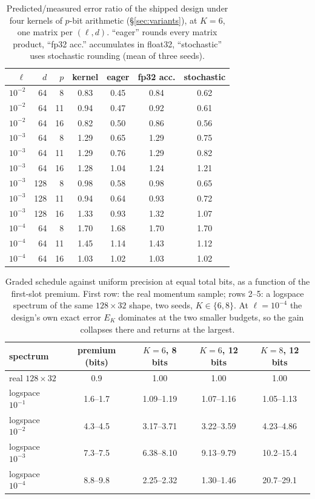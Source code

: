 \begin{table}[h]
\centering
\caption{Predicted/measured error ratio of the shipped design under four kernels of
$p$-bit arithmetic (\S\ref{sec:variants}), at $K=6$, one matrix per
$(\ell,d)$.  ``eager'' rounds every matrix product, ``fp32 acc.'' accumulates in
float32, ``stochastic'' uses stochastic rounding (mean of three seeds).}
\label{tab:variants}
\begin{tabular}{rrrcccc}
\toprule
$\ell$ & $d$ & $p$ & kernel & eager & fp32 acc. & stochastic \\
\midrule
$10^{-2}$ & 64 & 8 & 0.83 & 0.45 & 0.84 & 0.62 \\
$10^{-2}$ & 64 & 11 & 0.94 & 0.47 & 0.92 & 0.61 \\
$10^{-2}$ & 64 & 16 & 0.82 & 0.50 & 0.86 & 0.56 \\
$10^{-3}$ & 64 & 8 & 1.29 & 0.65 & 1.29 & 0.75 \\
$10^{-3}$ & 64 & 11 & 1.29 & 0.76 & 1.29 & 0.82 \\
$10^{-3}$ & 64 & 16 & 1.28 & 1.04 & 1.24 & 1.21 \\
$10^{-3}$ & 128 & 8 & 0.98 & 0.58 & 0.98 & 0.65 \\
$10^{-3}$ & 128 & 11 & 0.94 & 0.64 & 0.93 & 0.72 \\
$10^{-3}$ & 128 & 16 & 1.33 & 0.93 & 1.32 & 1.07 \\
$10^{-4}$ & 64 & 8 & 1.70 & 1.68 & 1.70 & 1.70 \\
$10^{-4}$ & 64 & 11 & 1.45 & 1.14 & 1.43 & 1.12 \\
$10^{-4}$ & 64 & 16 & 1.03 & 1.02 & 1.03 & 1.02 \\
\bottomrule
\end{tabular}
\end{table}

\begin{table}[h]
\centering
\caption{Graded schedule against uniform precision at equal total bits, as a function
of the first-slot premium.  First row: the real momentum sample; rows 2--5: a
logspace spectrum of the same $128\times32$ shape, two seeds, $K\in\{6,8\}$.  At
$\ell=10^{-4}$ the design's own exact error $E_K$ dominates at the two smaller budgets,
so the gain collapses there and returns at the largest.}
\label{tab:premium}
\begin{tabular}{lcccc}
\toprule
spectrum & premium (bits) & $K{=}6$, 8 bits & $K{=}6$, 12 bits & $K{=}8$, 12 bits \\
\midrule
real $128\times32$ & 0.9 & 1.00 & 1.00 & 1.00 \\
logspace $10^{-1}$ & 1.6--1.7 & 1.09--1.19 & 1.07--1.16 & 1.05--1.13 \\
logspace $10^{-2}$ & 4.3--4.5 & 3.17--3.71 & 3.22--3.59 & 4.23--4.86 \\
logspace $10^{-3}$ & 7.3--7.5 & 6.38--8.10 & 9.13--9.79 & 10.2--15.4 \\
logspace $10^{-4}$ & 8.8--9.8 & 2.25--2.32 & 1.30--1.46 & 20.7--29.1 \\
\bottomrule
\end{tabular}
\end{table}

